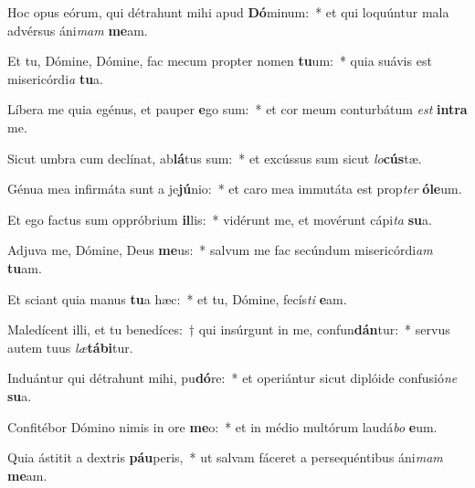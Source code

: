 \item Hoc opus eórum, qui détrahunt mihi apud \textbf{Dó}minum:~* et qui loquúntur mala advérsus áni\textit{mam} \textbf{me}am.
\item Et tu, Dómine, Dómine, fac mecum propter nomen \textbf{tu}um:~* quia suávis est misericórdi\textit{a} \textbf{tu}a.
\item Líbera me quia egénus, et pauper \textbf{e}go sum:~* et cor meum conturbátum \textit{est} \textbf{in}\textbf{tra} me.
\item Sicut umbra cum declínat, ab\textbf{lá}tus sum:~* et excússus sum sicut \textit{lo}\textbf{cús}tæ.
\item Génua mea infirmáta sunt a je\textbf{jú}nio:~* et caro mea immutáta est prop\textit{ter} \textbf{ó}\textbf{le}um.
\item Et ego factus sum oppróbrium \textbf{il}lis:~* vidérunt me, et movérunt cápi\textit{ta} \textbf{su}a.
\item Adjuva me, Dómine, Deus \textbf{me}us:~* salvum me fac secúndum misericórdi\textit{am} \textbf{tu}am.
\item Et sciant quia manus \textbf{tu}a hæc:~* et tu, Dómine, fecís\textit{ti} \textbf{e}am.
\item Maledícent illi, et tu benedíces:~† qui insúrgunt in me, confun\textbf{dán}tur:~* servus autem tuus \textit{læ}\textbf{tá}\textbf{bi}tur.
\item Induántur qui détrahunt mihi, pu\textbf{dó}re:~* et operiántur sicut diplóide confusió\textit{ne} \textbf{su}a.
\item Confitébor Dómino nimis in ore \textbf{me}o:~* et in médio multórum laudá\textit{bo} \textbf{e}um.
\item Quia ástitit a dextris \textbf{páu}peris,~* ut salvam fáceret a persequéntibus áni\textit{mam} \textbf{me}am.
